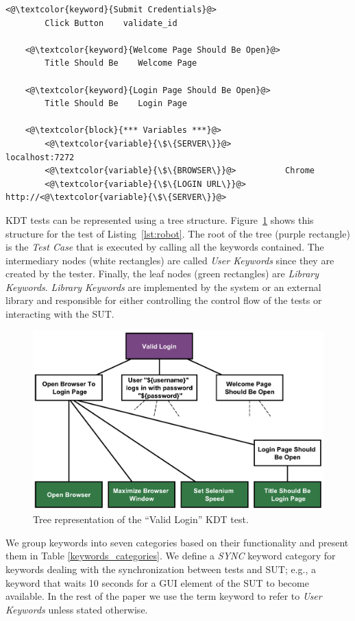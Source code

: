 \begin{lstlisting}[caption={Example of Robot Framework test}, label={lst:robot}]
    <@\textcolor{keyword}{Submit Credentials}@>
        Click Button    validate_id
        
    <@\textcolor{keyword}{Welcome Page Should Be Open}@>
        Title Should Be    Welcome Page
        
    <@\textcolor{keyword}{Login Page Should Be Open}@>
        Title Should Be    Login Page
    
    <@\textcolor{block}{*** Variables ***}@>
        <@\textcolor{variable}{\$\{SERVER\}}@>           localhost:7272
        <@\textcolor{variable}{\$\{BROWSER\}}@>          Chrome        
        <@\textcolor{variable}{\$\{LOGIN URL\}}@>        http://<@\textcolor{variable}{\$\{SERVER\}}@>
\end{lstlisting}

KDT tests can be represented using a tree structure. Figure~\ref{fig:robotframework_tree} shows this structure for the test of Listing~\ref{lst:robot}. The root of the tree (purple rectangle) is the \emph{Test Case} that is executed by calling all the keywords contained. The intermediary nodes (white rectangles) are called \emph{User Keywords} since they are created by the tester. Finally, the leaf nodes (green rectangles) are \emph{Library Keywords}. \emph{Library Keywords} are implemented by the system or an external library and responsible for either controlling the control flow of the tests or interacting with the SUT.

\begin{figure}
\centering
\includegraphics[width=\columnwidth]{figures/evolution/robotframework_tree.pdf}
\caption{Tree representation of the ``Valid Login'' KDT test.}
\label{fig:robotframework_tree}
\end{figure}

We group keywords into seven categories based on their functionality and present them in Table \ref{keywords_categories}. We define a \emph{SYNC}
keyword category for keywords dealing with the synchronization between tests and SUT; e.g., a keyword that waits 10 seconds for a GUI element of the SUT to become available. In the rest of the paper we use the term keyword to refer to \emph{User Keywords} unless stated otherwise.

